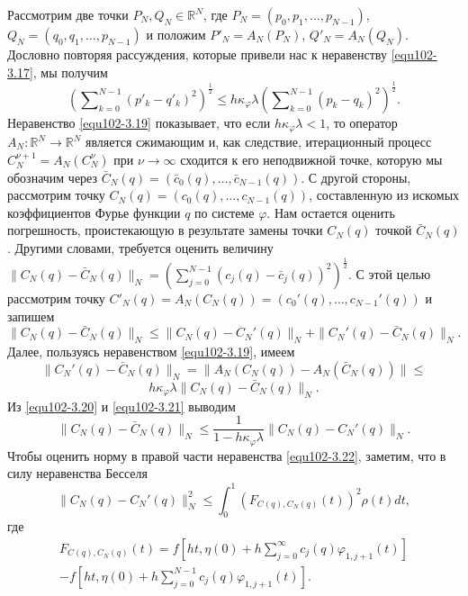  Рассмотрим две точки $P_N,Q_N\in \mathbb{R}^N$, где $P_N=(p_0,p_1,\ldots,p_{N-1})$,\\   $Q_N=(q_0,q_1,\ldots,p_{N-1})$ и положим $P'_N=A_N(P_N)$, $Q'_N=A_N(Q_N)$. Дословно повторяя рассуждения, которые привели нас к неравенству \eqref{equ102-3.17}, мы получим
\begin{equation}\label{equ102-3.19}
\left(\sum\nolimits_{k=0}^{N-1} (p'_k-q'_k)^2\right)^\frac12\le h\kappa_\varphi\lambda \left(\sum\nolimits_{k=0}^{N-1} (p_k-q_k)^2\right)^\frac12.
\end{equation}
Неравенство \eqref{equ102-3.19} показывает, что если $h\kappa_\varphi\lambda<1$, то оператор  $A_N:\mathbb{R}^N\to \mathbb{R}^N$ является сжимающим и, как следствие, итерационный процесс $C_N^{\nu+1}=A_N(C_N^{\nu})$  при $\nu\to\infty$ сходится к его неподвижной точке, которую мы обозначим через  $\bar C_N(q)=(\bar c_0(q),\ldots,\bar c_{N-1}(q))$. С другой стороны, рассмотрим точку $C_N(q)=(c_0(q),\ldots,c_{N-1}(q))$, составленную из искомых коэффициентов Фурье функции $q$ по системе $\varphi$. Нам остается оценить погрешность, проистекающую в результате замены точки $C_N(q)$ точкой $\bar C_N(q)$. Другими словами, требуется оценить величину
$\|C_N(q)-\bar C_N(q)\|_N= \left(\sum_{j=0}^{N-1}(c_j(q)-\bar c_j(q))^2\right)^\frac12$. С этой целью рассмотрим точку $C'_N(q)=A_N(C_N(q))=(c_0'(q),\ldots,c_{N-1}'(q))$ и запишем
\begin{equation}\label{equ102-3.20}
\|C_N(q)-\bar C_N(q)\|_N\le \|C_N(q)- C_N'(q)\|_N+\|C_N'(q)-\bar C_N(q)\|_N.
\end{equation}
Далее, пользуясь неравенством \eqref{equ102-3.19}, имеем
$$
\|C_N'(q)-\bar C_N(q)\|_N=\|A_N(C_N(q))-A_N(\bar C_N(q))\|\le
$$
\begin{equation}\label{equ102-3.21}
h\kappa_\varphi\lambda\|C_N(q)-\bar C_N(q)\|_N.
\end{equation}
Из \eqref{equ102-3.20} и \eqref{equ102-3.21} выводим
\begin{equation}\label{equ102-3.22}
\|C_N(q)-\bar C_N(q)\|_N\le \frac1{1-h\kappa_\varphi\lambda}\|C_N(q)- C_N'(q)\|_N.
\end{equation}
Чтобы оценить норму в правой части неравенства \eqref{equ102-3.22}, заметим, что в силу неравенства Бесселя
\begin{equation}\label{equ102-3.23}
\|C_N(q)- C_N'(q)\|_N^2\le \int_{0}^1(F_{C(q),C_N(q)}(t))^2\rho(t) dt,
\end{equation}
где
\begin{multline}\label{equ102-3.24}
 F_{C(q),C_N(q)}(t)=f\left[ht,\eta(0)+ h\sum\nolimits_{j=0}^\infty c_j(q)\varphi_{1,j+1}(t)\right] \\
  -f\left[ht,\eta(0)+ h\sum\nolimits_{j=0}^{N-1}c_j(q)\varphi_{1,j+1}(t)\right].
\end{multline}
